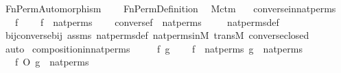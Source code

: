 %
\begin{isabellebody}%
%
%
\isadelimtheory
%
\endisadelimtheory
%
\isatagtheory
{}\isamarkupfalse%
\ Fn{\isacharunderscore}{\kern0pt}Perm{\isacharunderscore}{\kern0pt}Automorphism\ \isanewline
\ \ \ Fn{\isacharunderscore}{\kern0pt}Perm{\isacharunderscore}{\kern0pt}Definition\ \isanewline
\isanewline
{}%
\endisatagtheory
{\isafoldtheory}%
%
\isadelimtheory
\isanewline
%
\endisadelimtheory
{}\isamarkupfalse%
\ M{\isacharunderscore}{\kern0pt}ctm\ \ \isanewline
\isanewline
{}\isamarkupfalse%
\ converse{\isacharunderscore}{\kern0pt}in{\isacharunderscore}{\kern0pt}nat{\isacharunderscore}{\kern0pt}perms\ {\isacharcolon}{\kern0pt}\ \isanewline
\ \ \ f\ \isanewline
\ \ \ {\isachardoublequoteopen}f\ {\isasymin}\ nat{\isacharunderscore}{\kern0pt}perms{\isachardoublequoteclose}\ \isanewline
\ \ \ {\isachardoublequoteopen}converse{\isacharparenleft}{\kern0pt}f{\isacharparenright}{\kern0pt}\ {\isasymin}\ nat{\isacharunderscore}{\kern0pt}perms{\isachardoublequoteclose}\ \isanewline
%
\isadelimproof
\ \ %
\endisadelimproof
%
\isatagproof
{}\isamarkupfalse%
\ nat{\isacharunderscore}{\kern0pt}perms{\isacharunderscore}{\kern0pt}def\ \isanewline
\ \ \isamarkupfalse%
\ bij{\isacharunderscore}{\kern0pt}converse{\isacharunderscore}{\kern0pt}bij\ assms\ nat{\isacharunderscore}{\kern0pt}perms{\isacharunderscore}{\kern0pt}def\ nat{\isacharunderscore}{\kern0pt}perms{\isacharunderscore}{\kern0pt}in{\isacharunderscore}{\kern0pt}M\ transM\ converse{\isacharunderscore}{\kern0pt}closed\isanewline
\ \ \isamarkupfalse%
\ auto%
\endisatagproof
{\isafoldproof}%
%
\isadelimproof
\isanewline
%
\endisadelimproof
\isanewline
{}\isamarkupfalse%
\ composition{\isacharunderscore}{\kern0pt}in{\isacharunderscore}{\kern0pt}nat{\isacharunderscore}{\kern0pt}perms\ {\isacharcolon}{\kern0pt}\ \isanewline
\ \ \ f\ g\ \isanewline
\ \ \ {\isachardoublequoteopen}f\ {\isasymin}\ nat{\isacharunderscore}{\kern0pt}perms{\isachardoublequoteclose}\ {\isachardoublequoteopen}g\ {\isasymin}\ nat{\isacharunderscore}{\kern0pt}perms{\isachardoublequoteclose}\ \isanewline
\ \ \ {\isachardoublequoteopen}f\ O\ g\ {\isasymin}\ nat{\isacharunderscore}{\kern0pt}perms{\isachardoublequoteclose}\ \isanewline
%

\end{isabellebody}
